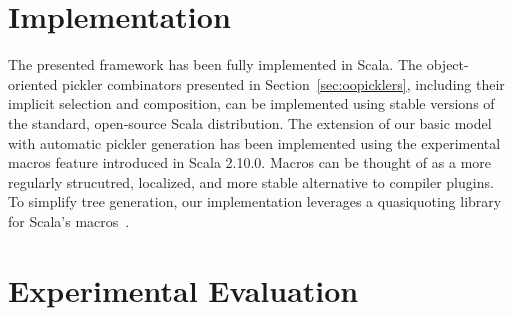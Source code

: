 \documentclass[10pt]{sigplanconf}
\theoremstyle{definition}
\theoremstyle{definition}
\newcommand{\todo}{{\bf \colorbox{red}{\color{white}TODO:}}}
\begin{document}
\section{Implementation}

The presented framework has been fully implemented in Scala.
The object-oriented pickler combinators presented in
Section~\ref{sec:oopicklers}, including their implicit selection and
composition, can be implemented using stable versions of the standard, open-source
Scala distribution. The extension of our basic model with
automatic pickler generation has been implemented using the experimental
macros feature introduced in Scala 2.10.0. Macros can be thought of as a
more regularly strucutred, localized, and more stable alternative to compiler
plugins. To simplify tree generation, our implementation leverages a
quasiquoting library for Scala's macros~\cite{Quasiquotes}.










\section{Experimental Evaluation}
\label{sec:evaluation}
\end{document}
